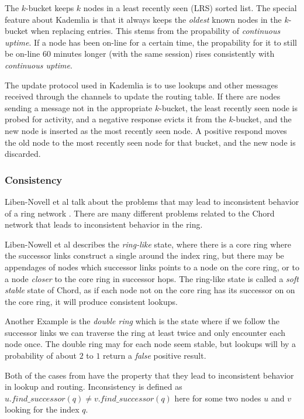 The $k$-bucket keeps $k$ nodes in a least recently seen (LRS) sorted list.
 The special feature about Kademlia is that it always keeps the \emph{oldest}
 known nodes in the $k$-bucket when replacing entries.
 This stems from the propability of \emph{continuous uptime}. If a node has been
 on-line for a certain time, the propability for it to still be on-line $60$
 minutes longer (with the same session) rises consistently with
 \emph{continuous uptime}.

The update protocol used in Kademlia is to use lookups and other messages received
 through the  channels to update the routing table. If there are
 nodes sending a message not in the appropriate $k$-bucket,
 the least recently seen node is probed
 for activity, and a negative response evicts it from the $k$-bucket, and the new node
 is inserted as the most recently seen node. A positive respond moves the old node to the most
 recently seen node for that bucket, and the new node is discarded.

\subsubsection{Consistency}

Liben-Novell et al talk about the problems that may lead to inconsistent behavior
 of a ring network \cite{liben-nowell-02-observations}. There are many different
 problems related to the Chord network that leads to inconsistent behavior in the
 ring.

Liben-Nowell et al describes the \emph{ring-like} state, where there is a
 core ring where the successor links construct a single  around the
 index ring, but there may be appendages of nodes which successor links points to
 a node on the core ring, or to a node \emph{closer} to the core ring in successor
 hops. The ring-like state is called a \emph{soft stable} state of Chord, as if
 each node not on the core ring has its successor on on the core ring, it will
 produce consistent lookups.

Another Example is the \emph{double ring} which is the state where if we follow
 the successor links we can traverse the ring at least twice and only encounter each
 node once. The double ring may for each node seem stable, but lookups will by a 
 probability of about $2$ to $1$ return a \emph{false} positive result.

Both of the cases from \cite{liben-nowell-02-observations} have the property that
 they lead to inconsistent behavior in lookup and routing. Inconsistency is
 defined as $u.find\_successor(q)\neq{}v.find\_successor(q)$ here for some two nodes
 $u$ and $v$ looking for the index $q$.

